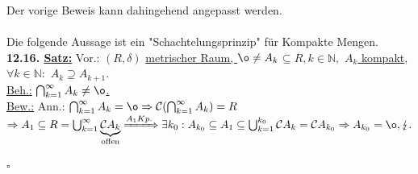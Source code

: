 \documentclass[]{scrartcl}
\begin{document}
	Der vorige Beweis kann dahingehend angepasst werden.\\
	\\
	Die folgende Aussage ist ein "Schachtelungsprinzip" für Kompakte Mengen.\\
	\textbf{12.16. \underline{Satz:}} Vor.: $(R,\delta)$ \ul{metrischer Raum, $\o\neq A_k$}$\subseteq R, k\in \mathbb{N},$ \ul{$A_k$ kompakt},\\
	$\forall k \in \mathbb{N}:$ \ul{$A_k\supseteq A_{k+1}$}.\\
	\underline{Beh.:} \ul{$\bigcap_{k=1}^\infty A_k\neq \o$.}\\
	\underline{Bew.:} Ann.: $\bigcap_{k=1}^\infty A_k=\o \Rightarrow \mathcal{C}(\bigcap_{k=1}^\infty A_k)=R$\\
	$\Rightarrow A_1 \subseteq R = \bigcup_{k=1}^\infty \underbrace{\mathcal{C}A_k}_{\text{offen}}\xRightarrow{A_1 Kp.} \exists k_0: A_{k_0}\subseteq A_1\subseteq \bigcup_{k=1}^{k_0}\mathcal{C} A_k=\mathcal{C}A_{k_0}\\
	\Rightarrow A_{k_0} = \o, \lightning.$\\
	\strut\hfill$\square$\\
	
	
	
	
	
	
	
	
	
	
	
	
	
	
	
	
	
	
	
\end{document}
